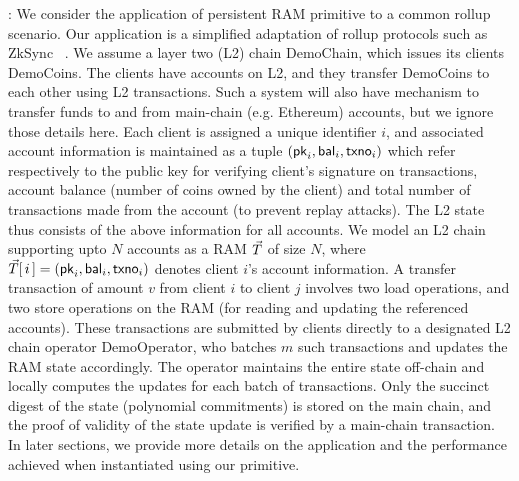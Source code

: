 \documentclass[sigconf]{acmart}
\begin{document}
: We consider the application of persistent RAM primitive to a common rollup scenario.
Our application is a simplified adaptation of rollup protocols such as ZkSync ~\cite{ZkSync}.
We assume a layer two (L2) chain \textsf{DemoChain}, which issues its clients \textsf{DemoCoins}. The clients have accounts on
L2, and they transfer \textsf{DemoCoins} to each other using L2 transactions. Such a system will also have mechanism to transfer
funds to and from main-chain (e.g. Ethereum) accounts, but we
ignore those details here.
Each client is assigned a unique identifier $i$, and associated account information  is maintained as
a tuple $(\mathsf{pk}_i,\mathsf{bal}_i,\mathsf{txno}_i)$ which refer respectively to the public key for verifying client's signature on transactions,
account balance (number of coins owned by the client) and total number of transactions made from the account (to prevent replay attacks).
The L2 state thus consists of the above information for all accounts. We model an L2 chain supporting upto $N$ accounts as a RAM $\vec{T}$
of size $N$, where $\vec{T}[\,i\,]=(\mathsf{pk}_i,\mathsf{bal}_i,\mathsf{txno}_i)$ denotes client $i$'s account information. A transfer transaction of amount $v$
from client $i$ to client $j$ involves two load operations, and two store operations on the RAM (for reading and updating the referenced
accounts). These transactions are submitted by clients directly to a designated L2 chain operator \textsf{DemoOperator}, who batches $m$
such transactions and updates the RAM state accordingly. The operator maintains the entire state off-chain and locally computes the updates for
each batch of transactions. Only the succinct digest of the state (polynomial commitments) is stored on the main chain, and the proof of
validity of the state update is verified by a main-chain transaction. In later sections, we provide more details on the application and the
performance achieved when instantiated using our primitive.
\end{document}
